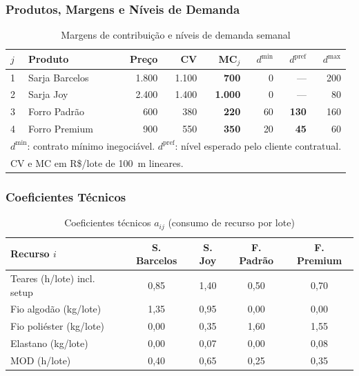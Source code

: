 \subsubsection{Produtos, Margens e Níveis de Demanda}

\begin{table}[H]
\centering
\caption{Margens de contribuição e níveis de demanda semanal}
\label{tab:prod_r2}
\begin{tabular}{llrrrrrr}
\toprule
\textbf{$j$} & \textbf{Produto} & \textbf{Preço} & \textbf{CV} & \textbf{MC$_j$} & \textbf{$d^{\min}$} & \textbf{$d^{\text{pref}}$} & \textbf{$d^{\max}$} \\
\midrule
1 & Sarja Barcelos  & 1.800 & 1.100 & \textbf{700}  &   0 & ---  & 200 \\
2 & Sarja Joy       & 2.400 & 1.400 & \textbf{1.000}&   0 & ---  &  80 \\
3 & Forro Padrão    &   600 &   380 & \textbf{220}  &  60 & \textbf{130} & 160 \\
4 & Forro Premium   &   900 &   550 & \textbf{350}  &  20 & \textbf{45}  &  60 \\
\bottomrule
\multicolumn{8}{l}{\footnotesize $d^{\min}$: contrato mínimo inegociável. $d^{\text{pref}}$: nível esperado pelo cliente contratual.}\\
\multicolumn{8}{l}{\footnotesize CV e MC em R\$/lote de 100~m lineares.}
\end{tabular}
\end{table}

\subsubsection{Coeficientes Técnicos}

\begin{table}[H]
\centering
\caption{Coeficientes técnicos $a_{ij}$ (consumo de recurso por lote)}
\label{tab:coef_r2}
\renewcommand{\arraystretch}{1.2}
\begin{tabular}{lcccc}
\toprule
\textbf{Recurso $i$} & \textbf{S. Barcelos} & \textbf{S. Joy} & \textbf{F. Padrão} & \textbf{F. Premium} \\
\midrule
Teares (h/lote) incl. setup & 0,85 & 1,40 & 0,50 & 0,70 \\
Fio algodão (kg/lote)       & 1,35 & 0,95 & 0,00 & 0,00 \\
Fio poliéster (kg/lote)     & 0,00 & 0,35 & 1,60 & 1,55 \\
Elastano (kg/lote)          & 0,00 & 0,07 & 0,00 & 0,08 \\
MOD (h/lote)                & 0,40 & 0,65 & 0,25 & 0,35 \\
\bottomrule
\end{tabular}
\end{table}

